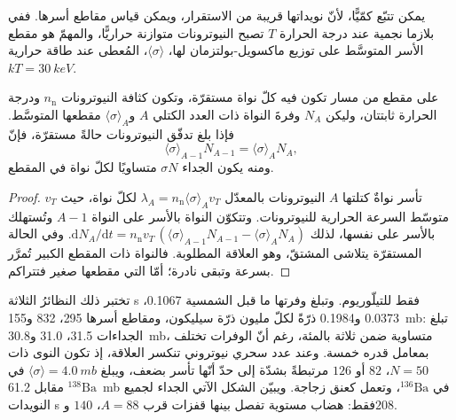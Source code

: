 يمكن تتبّع  كمّيًّا، لأنّ نويداتها
قريبة من الاستقرار، ويمكن قياس مقاطع أسرها. ففي بلازما نجمية عند درجة الحرارة
$T$ تصبح النيوترونات متوازنة حراريًّا، والمهمّ هو
مقطع الأسر المتوسَّط على توزيع ماكسويل-بولتزمان لها،
$\langle\sigma\rangle$، المُعطى عند طاقة حرارية
$kT = \qty{30}{keV}$.

\begin{proposition}\label{prop:b3:origin-of-elements:sigma-n}
على مقطع من مسار  تكون فيه كلّ نواة مستقرّة، وتكون كثافة
النيوترونات $n_\mathrm{n}$ ودرجة الحرارة ثابتتان، وليكن $N_A$ وفرةَ النواة
ذات العدد الكتلي $A$ و$\langle\sigma\rangle_A$ مقطعها المتوسَّط.
فإذا بلغ تدفّق النيوترونات حالةً مستقرّة،
فإنّ
\[
\langle\sigma\rangle_{A-1} N_{A-1} = \langle\sigma\rangle_A N_A ,
\]
ومنه يكون الجداء $\sigma N$ متساويًا لكلّ نواة
في المقطع.
\end{proposition}

\begin{proof}
تأسر نواةٌ كتلتها $A$ النيوترونات بالمعدّل
$\lambda_A = n_\mathrm{n}\langle\sigma\rangle_A v_T$ لكلّ نواة، حيث
$v_T$ متوسّط السرعة الحرارية للنيوترونات. وتتكوّن النواة بالأسر
على النواة $A - 1$ وتُستهلك بالأسر على نفسها، لذلك
$\mathrm{d}N_A/\mathrm{d}t = n_\mathrm{n} v_T\,(\langle\sigma\rangle_{A-1}
N_{A-1} - \langle\sigma\rangle_A N_A)$. وفي الحالة المستقرّة
يتلاشى المشتقّ، وهو العلاقة المطلوبة. فالنواة ذات المقطع الكبير تُمرَّر
بسرعة وتبقى نادرة؛ أمّا التي مقطعها صغير
فتتراكم.
\end{proof}

تختبر ذلك النظائرُ الثلاثة s فقط للتيلّوريوم. وتبلغ وفرتها ما قبل الشمسية
\num{0.1067}، \num{0.0373} و\num{0.1984} ذرّةً لكلّ
مليون ذرّة سيليكون، ومقاطع أسرها \num{295}، \num{832}
و\qty{155}{mb}: تبلغ الجداءات \num{31.5}، \num{31.0}
و\qty{30.8}{mb}، متساوية ضمن ثلاثة بالمئة، رغم أنّ الوفرات
تختلف بمعامل قدره خمسة. وعند عدد سحري نيوتروني
تنكسر العلاقة، إذ تكون النوى ذات $N = 50$، $82$ أو $126$ مرتبطةً بشدّة إلى حدّ أنّها
تأسر بضعف، ويبلغ $\langle\sigma\rangle = \qty{4.0}{mb}$ في
$^{138}\mathrm{Ba}$ مقابل \qty{61.2}{mb} في $^{136}\mathrm{Ba}$،
وتعمل كعنق زجاجة. ويبيّن الشكل الآتي الجداء لجميع
النويدات s فقط: هضاب مستوية تفصل بينها قفزات قرب $A = 88$، $140$
و$208$.

